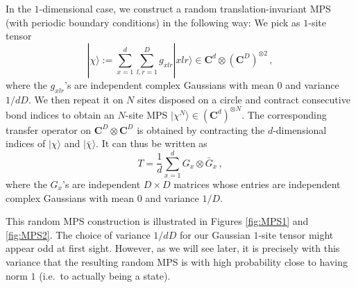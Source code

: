 \documentclass{amsart}
\newcommand{\C}{\mathbf{C}}
\newcommand{\ket}[1]{| #1 \rangle}
\begin{document}
\begin{figure}[h]
\begin{center}
    \end{center}
\end{figure}


In the $1$-dimensional case, we construct a random translation-invariant MPS (with periodic boundary conditions) in the following way: We pick as $1$-site tensor
\begin{equation} \label{eq:MPS}
    \ket{\chi} := \sum_{x=1}^d \sum_{l,r=1}^D g_{xlr}\ket{xlr} \in \C^d\otimes(\C^D)^{\otimes 2} \, ,
\end{equation}
where the $g_{xlr}$'s are independent complex Gaussians with mean $0$ and variance $1/dD$. We then repeat it on $N$ sites disposed on a circle and contract consecutive bond indices to obtain an $N$-site MPS $\ket{\chi^{N}}\in (\C^d)^{\otimes N}$.
The corresponding transfer operator on $\C^D\otimes\C^D$ is obtained by contracting the $d$-dimensional indices of $\ket{\chi}$ and $\ket{\bar{\chi}}$. It can thus be written as
\begin{equation} \label{eq:transfer-MPS}
    T = \frac{1}{d} \sum_{x=1}^d G_x \otimes \bar{G}_x \, ,
\end{equation}
where the $G_x$'s are independent $D\times D$ matrices whose entries are independent complex Gaussians with mean $0$ and variance $1/D$.

This random MPS construction is illustrated in Figures \ref{fig:MPS1} and \ref{fig:MPS2}. The choice of variance $1/dD$ for our Gaussian $1$-site tensor might appear odd at first sight. However, as we will see later, it is precisely with this variance that the resulting random MPS is with high probability close to having norm $1$ (i.e.~to actually being a state).
\end{document}
